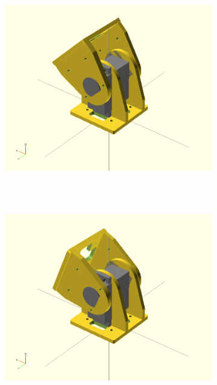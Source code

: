 \begin{figure}[h]
\begin{subfigure}[b]{0.18\textwidth}
        \end{subfigure}
        ~
        \begin{subfigure}[b]{0.18\textwidth}
         	   \centering
                \includegraphics[width=\textwidth]{images/Gait_osc_offset_45.png}
                ~
                \label{fig:Gait_osc_offset_45-2}
        \end{subfigure}
        ~
                \begin{subfigure}[b]{0.18\textwidth}
                \centering
                \includegraphics[width=\textwidth]{images/Gait_osc_offset_22_5.png}
                 ~

\end{subfigure}
\end{figure}
